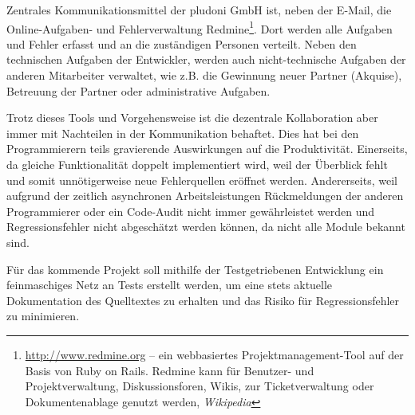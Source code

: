 Zentrales Kommunikationsmittel der pludoni GmbH ist, neben der E-Mail, die Online-Aufgaben- und Fehlerverwaltung Redmine\footnote{\url{http://www.redmine.org} -- ein webbasiertes Projektmanagement-Tool auf der Basis von Ruby on Rails. Redmine kann für Benutzer- und Projektverwaltung, Diskussionsforen, Wikis, zur Ticketverwaltung oder Dokumentenablage genutzt werden, \textit{Wikipedia}}. Dort werden alle Aufgaben und Fehler erfasst und an die zuständigen Personen verteilt.
Neben den technischen Aufgaben der Entwickler, werden auch nicht-technische Aufgaben der anderen Mitarbeiter verwaltet, wie z.B. die Gewinnung neuer Partner (Akquise), Betreuung der Partner oder administrative Aufgaben.

Trotz dieses Tools und Vorgehensweise ist die dezentrale Kollaboration aber immer mit Nachteilen in der Kommunikation behaftet. Dies hat bei den Programmierern teils gravierende Auswirkungen auf die Produktivität. Einerseits, da gleiche Funktionalität doppelt implementiert wird, weil der Überblick fehlt und somit unnötigerweise neue Fehlerquellen eröffnet werden. Andererseits, weil aufgrund der zeitlich asynchronen Arbeitsleistungen Rückmeldungen der anderen Programmierer oder ein Code-Audit nicht immer gewährleistet werden und Regressionsfehler nicht abgeschätzt werden können, da nicht alle Module bekannt sind.

Für das kommende Projekt soll mithilfe der Testgetriebenen Entwicklung ein feinmaschiges Netz an Tests erstellt werden, um eine stets aktuelle Dokumentation des Quelltextes zu erhalten und das Risiko für Regressionsfehler zu minimieren.
